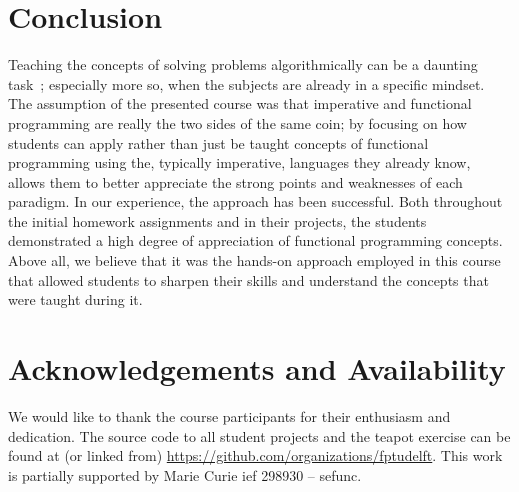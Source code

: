 \documentclass[conference]{sig-alternate}
\begin{document}
%
%
\section{Conclusion}

Teaching the concepts of solving problems algorithmically can be a daunting
task~\cite{Futsc06}; especially more so, when the subjects are already in a
specific mindset. The assumption of the presented course was that imperative and
functional programming are really the two sides of the same coin; by focusing on
how students can apply rather than just be taught concepts of functional
programming using the, typically imperative, languages they already know, allows
them to better appreciate the strong points and weaknesses of each paradigm. In
our experience, the approach has been successful. Both throughout the initial
homework assignments and in their projects, the students demonstrated a high
degree of appreciation of functional programming concepts. Above all, we
believe that it was the hands-on approach 
employed in this course that allowed students to sharpen their skills and
understand the concepts that were taught during it.

\section*{Acknowledgements and Availability}
We would like to thank the course participants for their enthusiasm and
dedication. The source code to all student projects and the teapot
exercise can be found at (or linked from) \href{https://github.com/organizations/fptudelft}{https://\-github.com\-/organizations\-/fptudelft}. This work is partially supported by Marie Curie {\sc ief} 298930 -- {\sc sefunc}.



\end{document}
